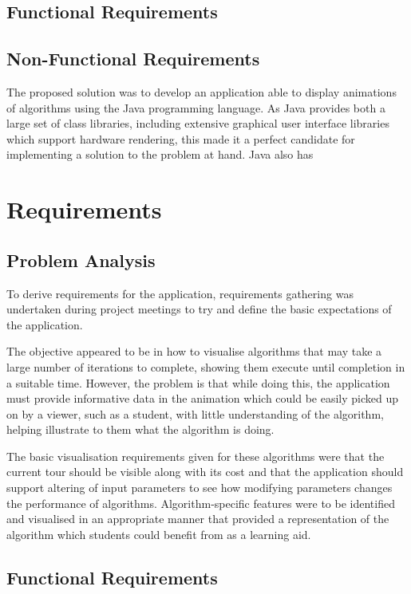 \documentclass{l4proj}
\begin{document}
\section{Functional Requirements}

\section{Non-Functional Requirements}
The proposed solution was to develop an application able to display animations of algorithms using the Java programming 
language. As Java provides both a large set of class libraries, including extensive graphical user interface libraries which 
support hardware rendering, this made it a perfect candidate for implementing a solution to the problem at hand. Java also has 


\chapter{Requirements}
\label{reqs}
\section{Problem Analysis}
To derive requirements for the application, requirements gathering was undertaken during project meetings to try and define the basic 
expectations of the application.

The objective appeared to be in how to visualise algorithms that may take a large number of iterations to complete, showing them execute until 
completion in a suitable time. However, the problem is that while doing this, the application must provide informative data in the animation 
which could be easily picked up on by a viewer, such as a student, with little understanding of the algorithm, helping illustrate to them 
what the algorithm is doing.

The basic visualisation requirements given for these algorithms were that the current tour should be visible along with its cost and 
that the application should support altering of input parameters to see how modifying parameters changes the performance of algorithms. 
Algorithm-specific features were to be identified and visualised in an appropriate manner that provided a representation of the 
algorithm which students could benefit from as a learning aid.

\section{Functional Requirements}
\end{document}

